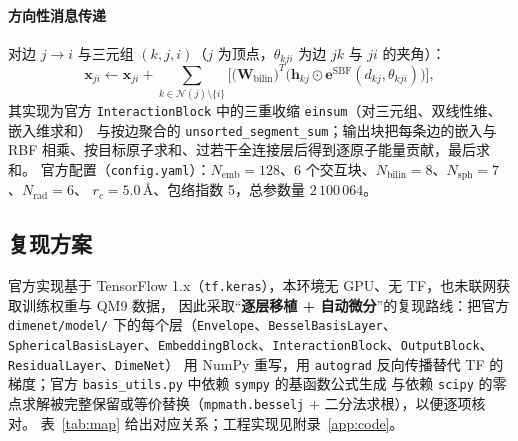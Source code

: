\documentclass[UTF8,a4paper,11pt]{ctexart}
\newcommand{\ang}{\,\text{\AA}}
\begin{document}
\paragraph{方向性消息传递} 对边 $j\to i$ 与三元组 $(k,j,i)$（$j$ 为顶点，$\theta_{kji}$ 为边 $jk$ 与 $ji$ 的夹角）：
\begin{equation}
\bm x_{ji}\leftarrow \bm x_{ji}+\sum_{k\in\mathcal N(j)\setminus\{i\}}\Big[\big(\bm W_{\mathrm{bilin}}\big)^{\!T}\big(\bm h_{kj}\odot \bm e^{\mathrm{SBF}}(d_{kj},\theta_{kji})\big)\Big],
\end{equation}
其实现为官方 \texttt{InteractionBlock} 中的三重收缩 \texttt{einsum}（对三元组、双线性维、嵌入维求和）
与按边聚合的 \texttt{unsorted\_segment\_sum}；输出块把每条边的嵌入与 RBF 相乘、按目标原子求和、过若干全连接层后得到逐原子能量贡献，最后求和。
官方配置（\texttt{config.yaml}）：$N_{\mathrm{emb}}=128$、6 个交互块、$N_{\mathrm{bilin}}=8$、$N_{\mathrm{sph}}=7$、$N_{\mathrm{rad}}=6$、
$r_c=5.0\ang$、包络指数 5，总参数量 $2\,100\,064$。

\subsection{复现方案}
官方实现基于 TensorFlow 1.x（\texttt{tf.keras}），本环境无 GPU、无 TF，也未联网获取训练权重与 QM9 数据，
因此采取“\textbf{逐层移植 + 自动微分}”的复现路线：把官方 \texttt{dimenet/model/} 下的每个层（\texttt{Envelope}、\texttt{BesselBasisLayer}、
\texttt{SphericalBasisLayer}、\texttt{EmbeddingBlock}、\texttt{InteractionBlock}、\texttt{OutputBlock}、\texttt{ResidualLayer}、\texttt{DimeNet}）
用 NumPy 重写，用 \texttt{autograd} 反向传播替代 TF 的梯度；官方 \texttt{basis\_utils.py} 中依赖 \texttt{sympy} 的基函数公式生成
与依赖 \texttt{scipy} 的零点求解被完整保留或等价替换（\texttt{mpmath.besselj} + 二分法求根），以便逐项核对。
表~\ref{tab:map} 给出对应关系；工程实现见附录~\ref{app:code}。
\end{document}
